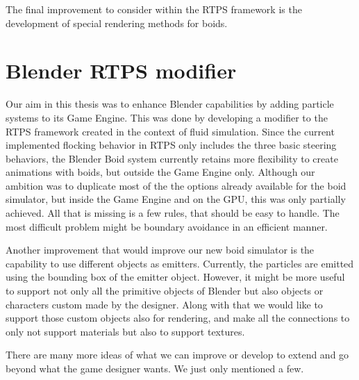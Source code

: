 The final improvement to consider within the RTPS framework is the development of special rendering methods for boids. 

\section{Blender RTPS modifier}
Our aim in this thesis was to enhance Blender capabilities by adding particle systems to its Game Engine. This was done by developing a modifier to the RTPS framework created in the context of fluid simulation. Since the current implemented flocking behavior in RTPS only includes the three basic steering behaviors, the Blender Boid system currently retains more flexibility to create animations with boids, but outside the Game Engine only.  Although our ambition was to duplicate most of the the options already available for the boid simulator, but inside the Game Engine and on the GPU, this was only partially achieved. All that is 
missing is a few rules, that should be easy to handle. The most difficult problem might be boundary avoidance in an efficient manner. 


Another improvement that would improve our new boid simulator is the capability to use different objects as emitters. Currently, the particles are emitted using the bounding box of the emitter object. However, it might be more useful to support not only all the primitive objects of Blender but also objects or characters custom made by the designer. Along with that we would like to support those custom objects also for rendering, and make all the connections to only not support materials but also to support textures.

There are many more ideas of what we can improve or develop to extend and go beyond what the game designer wants. We just only mentioned a few.


